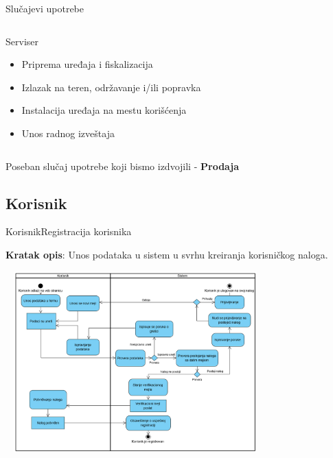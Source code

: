 \documentclass[9pt]{beamer}
\begin{document}
\begin{frame}{Slučajevi upotrebe}
\begin{center}
\begin{columns}
\begin{alertblock}{Serviser}
            \begin{itemize}
                \item Priprema uređaja i fiskalizacija
                \item Izlazak na teren, održavanje i/ili popravka
                \item Instalacija uređaja na mestu korišćenja
                \item Unos radnog izveštaja
            \end{itemize}
            \end{alertblock}
    \end{columns}
    Poseban slučaj upotrebe koji bismo izdvojili - \textbf{\alert{Prodaja}}
    \end{center}
\end{frame}

\subsection{Korisnik}
\begin{frame}{Korisnik}{Registracija korisnika}
    \begin{center}
    \small{
    \textbf{Kratak opis}: Unos podataka u sistem u svrhu kreiranja korisničkog naloga.}
    \end{center}
    \begin{center}
        \includegraphics[width=10cm, height=7cm]{assets/dijagramAktivnostiRegistracija.png}
    \end{center}
\end{frame}
\end{document}
